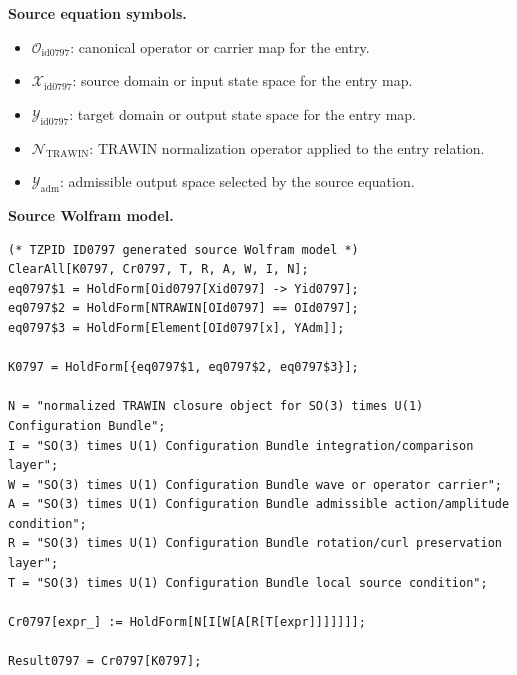\begin{minipage}[t]{0.49\linewidth}
\begingroup
\small
\raggedright
\textbf{Source equation symbols.}\par
\begin{itemize}[leftmargin=1.35em,itemsep=1pt,topsep=1pt,parsep=0pt]
    \item $\mathcal{O}_{\mathrm{id0797}}$: canonical operator or carrier map for the entry.
    \item $\mathcal{X}_{\mathrm{id0797}}$: source domain or input state space for the entry map.
    \item $\mathcal{Y}_{\mathrm{id0797}}$: target domain or output state space for the entry map.
    \item $\mathcal{N}_{\mathrm{TRAWIN}}$: TRAWIN normalization operator applied to the entry relation.
    \item $\mathcal{Y}_{\mathrm{adm}}$: admissible output space selected by the source equation.
\end{itemize}
\endgroup
\end{minipage}\hfill
\begin{minipage}[t]{0.47\linewidth}
\begingroup
\scriptsize
\raggedright
\textbf{Source Wolfram model.}\par
\begin{Verbatim}[fontsize=\tiny,breaklines=true,breakanywhere=true]
(* TZPID ID0797 generated source Wolfram model *)
ClearAll[K0797, Cr0797, T, R, A, W, I, N];
eq0797$1 = HoldForm[Oid0797[Xid0797] -> Yid0797];
eq0797$2 = HoldForm[NTRAWIN[OId0797] == OId0797];
eq0797$3 = HoldForm[Element[OId0797[x], YAdm]];

K0797 = HoldForm[{eq0797$1, eq0797$2, eq0797$3}];

N = "normalized TRAWIN closure object for SO(3) times U(1) Configuration Bundle";
I = "SO(3) times U(1) Configuration Bundle integration/comparison layer";
W = "SO(3) times U(1) Configuration Bundle wave or operator carrier";
A = "SO(3) times U(1) Configuration Bundle admissible action/amplitude condition";
R = "SO(3) times U(1) Configuration Bundle rotation/curl preservation layer";
T = "SO(3) times U(1) Configuration Bundle local source condition";

Cr0797[expr_] := HoldForm[N[I[W[A[R[T[expr]]]]]]];

Result0797 = Cr0797[K0797];
\end{Verbatim}
\endgroup
\end{minipage}

